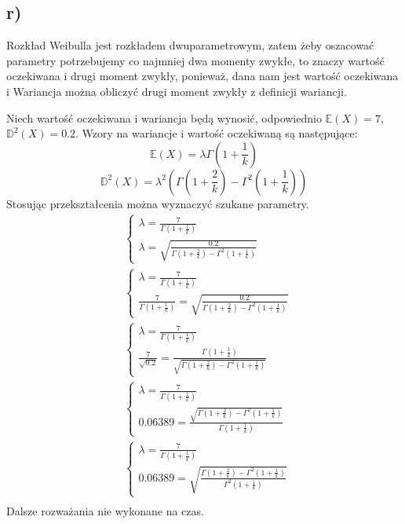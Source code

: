 \documentclass{article}
\begin{document}
\subsection{r)}
Rozkład Weibulla jest rozkładem dwuparametrowym, zatem żeby oszacować parametry potrzebujemy co najmniej dwa momenty zwykłe, to znaczy wartość oczekiwana i drugi moment zwykły, ponieważ, dana nam jest wartość oczekiwana i Wariancja można obliczyć drugi moment zwykły z definicji wariancji. \\ \par
Niech wartość oczekiwana i wariancja będą wynosić, odpowiednio $\mathbb{E}(X) = 7$, $\mathbb{D}^2(X) = 0.2$. Wzory na wariancje i wartość oczekiwaną są następujące:
\[\mathbb{E}(X) = \lambda \Gamma (1+\frac{1}{k}) \]
\[ \mathbb{D}^2(X) = \lambda^2 ( \Gamma (1+\frac{2}{k}) -  \Gamma^2 (1+\frac{1}{k})) \]
Stosując przekształcenia można wyznaczyć szukane parametry.
\begin{align*}
& \left\{
\begin{array}{c} \lambda = \frac{7}{\Gamma (1+\frac{1}{k})} \\ \lambda = \sqrt{\frac{0.2}{  \Gamma (1+\frac{2}{k}) -  \Gamma^2 (1+\frac{1}{k})}} \end{array} \right. \\
& \left\{
\begin{array}{c} \lambda = \frac{7}{\Gamma (1+\frac{1}{k})} \\ \frac{7}{\Gamma (1+\frac{1}{k})} = \sqrt{\frac{0.2}{  \Gamma (1+\frac{2}{k}) -  \Gamma^2 (1+\frac{1}{k})}} \end{array} \right. \\
& \left\{
\begin{array}{c} \lambda = \frac{7}{\Gamma (1+\frac{1}{k})} \\ \frac{7}{\sqrt{0.2}} = \frac{\Gamma (1+\frac{1}{k})}{ \sqrt{ \Gamma (1+\frac{2}{k}) -  \Gamma^2 (1+\frac{1}{k})}} \end{array} \right. \\
& \left\{
\begin{array}{c} \lambda = \frac{7}{\Gamma (1+\frac{1}{k})} 
\\ 0.06389 = \frac{ \sqrt{ \Gamma (1+\frac{2}{k}) -  \Gamma^2 (1+\frac{1}{k})}}{\Gamma (1+\frac{1}{k})} \end{array} \right. \\
& \left\{
\begin{array}{c} \lambda = \frac{7}{\Gamma (1+\frac{1}{k})} 
\\ 0.06389 = \sqrt{ \frac{  \Gamma (1+\frac{2}{k}) -  \Gamma^2 (1+\frac{1}{k})}{\Gamma^2 (1+\frac{1}{k})} } \end{array} \right. \\
\end{align*}
Dalsze rozważania nie wykonane na czas.
\end{document}
